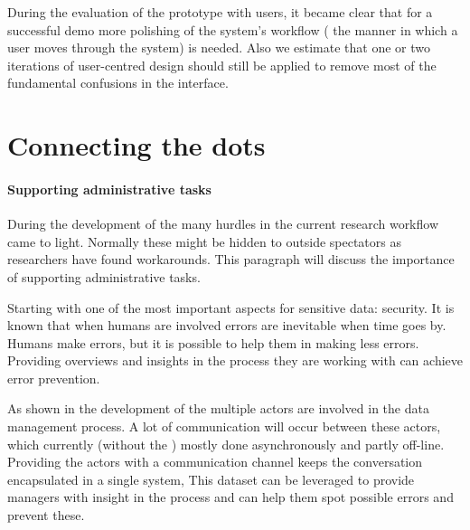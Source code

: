 During the evaluation of the prototype with users, it became clear that for a successful demo more polishing of the system's workflow (\ie{} the manner in which a user moves through the system) is needed.
Also we estimate that one or two iterations of user-centred design should still be applied to remove most of the fundamental confusions in the interface.

\section{Connecting the dots}


\paragraph{Supporting administrative tasks}

During the development of the \ivfsystem{} many hurdles in the current research workflow came to light. 
Normally these might be hidden to outside spectators as researchers have found workarounds.
This paragraph will discuss the importance of supporting administrative tasks.

Starting with one of the most important aspects for sensitive data: security.
It is known that when humans are involved errors are inevitable when time goes by.
Humans make errors, but it is possible to help them in making less errors.
Providing overviews and insights in the process they are working with can achieve error prevention.

As shown in the development of the \ivfsystem{} multiple actors are involved in the data management process.
A lot of communication will occur between these actors, which currently (without the \ivfsystem{})  mostly done asynchronously and partly off-line.
Providing the actors with a communication channel keeps the conversation encapsulated in a single system, 
This dataset can be leveraged to provide managers with insight in the process and can help them spot possible errors and prevent these.

